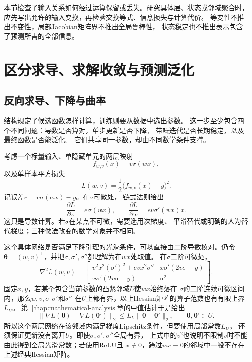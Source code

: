 本节检查了输入关系如何经过运算保留或丢失。研究具体层、状态或邻域聚合时，
应先写出允许的输入变换，再检验交换等式、信息损失与计算代价。
等变性不推出不变性，局部Jacobian矩阵界不推出全局鲁棒性，
状态稳定也不推出表示包含了预测所需的全部信息。

\section{区分求导、求解收敛与预测泛化}
\label{sec:future-neural-training-generalization}

\subsection{反向求导、下降与曲率}
\label{sec:future-backpropagation-descent-curvature}

结构规定了候选函数怎样计算，训练则要从数据中选出参数。
这一步至少包含四个不同问题：导数是否算对，单步更新是否下降，
带噪迭代是否长期稳定，以及最终函数是否能泛化。
它们共享同一参数，却由不同数学条件支撑。

考虑一个标量输入、单隐藏单元的两层映射
\[
  f_{w,v}(x)=v\sigma(wx),
\]
以及单样本平方损失
\[
  L(w,v)
  =
  \frac{1}{2}\bigl(f_{w,v}(x)-y\bigr)^2.
\]
记误差$e=v\sigma(wx)-y$。在$\sigma$可微处，
链式法则给出
\begin{equation}
  \frac{\partial L}{\partial v}
  =
  e\sigma(wx),
  \qquad
  \frac{\partial L}{\partial w}
  =
  ev\sigma'(wx)x.
  \label{eq:future-two-layer-gradient}
\end{equation}
这只是导数计算。若$\sigma$在某点不可微，需要选用次梯度、
平滑替代或明确的人为替代梯度；三种做法改变的数学对象并不相同。

这个具体网络是否满足下降引理的光滑条件，可以直接由二阶导数核对。仍令
\(\bm\theta=(w,v)^{\top}\)，并把\(\sigma,\sigma',\sigma''\)都理解为在\(wx\)处取值。
在\(\sigma\)二阶可微处，
\[
  \nabla^2 L(w,v)
  =
  \begin{bmatrix}
    v^2x^2(\sigma')^2+evx^2\sigma''
    &
    x\sigma'(2v\sigma-y)
    \\
    x\sigma'(2v\sigma-y)
    &
    \sigma^2
  \end{bmatrix}.
\]
固定\(x,y\)，若某个包含当前参数的凸紧邻域\(U\)使\(wx\)始终落在
\(\sigma\)的二阶连续可微区间内，那么\(w,v,\sigma,\sigma'\)和\(\sigma''\)
在\(U\)上都有界，以上Hessian矩阵的算子范数也有有限上界\(L_U\)。
第~\ref{chap:mathematical-analysis}章的中值估计于是给出
\[
  \lVert\nabla L(\bm\theta)-\nabla L(\bm\theta')\rVert_2
  \leq
  L_U\lVert\bm\theta-\bm\theta'\rVert_2,
  \qquad
  \bm\theta,\bm\theta'\in U.
\]
所以这个两层网络在该邻域内满足梯度Lipschitz条件，但要使用局部常数\(L_U\)，
还须保证更新没有离开\(U\)。即使\(\sigma,\sigma',\sigma''\)全局有界，
上式中的\(v^2\)也说明不限制\(v\)时不能由此得到全局光滑常数；若使用ReLU且
\(x\neq0\)，跨过\(wx=0\)的邻域中一般不存在上述经典Hessian矩阵。

